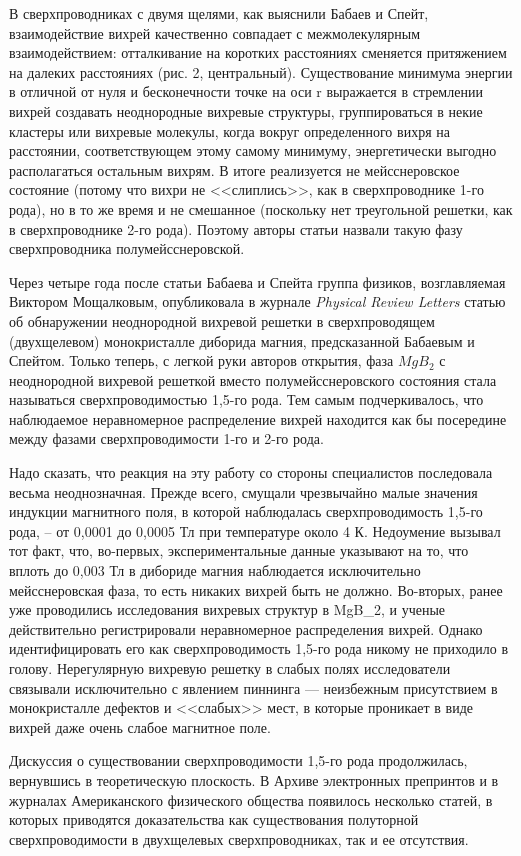 В сверхпроводниках с двумя щелями, как выяснили Бабаев и Спейт, взаимодействие 
вихрей качественно совпадает с межмолекулярным взаимодействием: отталкивание 
на коротких расстояниях сменяется притяжением на далеких расстояниях 
(рис. 2, центральный). Существование минимума энергии в отличной от нуля и 
бесконечности точке на оси r выражается в стремлении вихрей создавать 
неоднородные вихревые структуры, группироваться в некие кластеры или вихревые 
молекулы, когда вокруг определенного вихря на расстоянии, соответствующем 
этому самому минимуму, энергетически выгодно располагаться остальным вихрям. 
В итоге реализуется не мейсснеровское состояние (потому что вихри не 
<<слиплись>>, как в сверхпроводнике 1-го рода), но в то же время и не 
смешанное (поскольку нет треугольной решетки, как в сверхпроводнике 2-го 
рода). Поэтому авторы статьи назвали такую фазу сверхпроводника 
полумейсснеровской.

Через четыре года после статьи Бабаева и Спейта группа физиков, возглавляемая 
Виктором Мощалковым, опубликовала в журнале \emph{Physical Review Letters} 
статью об обнаружении неоднородной вихревой решетки в сверхпроводящем 
(двухщелевом) монокристалле диборида магния, предсказанной Бабаевым и Спейтом. 
Только теперь, с легкой руки авторов открытия, фаза \( MgB_2 \) с неоднородной
 вихревой решеткой вместо полумейсснеровского состояния стала называться 
 сверхпроводимостью 1,5-го рода. Тем самым подчеркивалось, что наблюдаемое 
 неравномерное распределение вихрей находится как бы посередине между фазами 
 сверхпроводимости 1-го и 2-го рода.

Надо сказать, что реакция на эту работу со стороны специалистов последовала 
весьма неоднозначная. Прежде всего, смущали чрезвычайно малые значения 
индукции магнитного поля, в которой наблюдалась сверхпроводимость 1,5-го 
рода, -- от 0,0001 до 0,0005 Тл при температуре около 4 К. Недоумение вызывал 
тот факт, что, во-первых, экспериментальные данные указывают на то, что 
вплоть до 0,003 Тл в дибориде магния наблюдается исключительно мейсснеровская 
фаза, то есть никаких вихрей быть не должно. Во-вторых, ранее уже проводились 
исследования вихревых структур в MgB_2, и ученые действительно регистрировали 
неравномерное распределения вихрей. Однако идентифицировать его как 
сверхпроводимость 1,5-го рода никому не приходило в голову. Нерегулярную 
вихревую решетку в слабых полях исследователи связывали исключительно с 
явлением пиннинга — неизбежным присутствием в монокристалле дефектов и 
<<слабых>> мест, в которые проникает в виде вихрей даже очень слабое 
магнитное поле.

Дискуссия о существовании сверхпроводимости 1,5-го рода продолжилась, 
вернувшись в теоретическую плоскость. В Архиве электронных препринтов и в 
журналах Американского физического общества появилось несколько статей, в 
которых приводятся доказательства как существования полуторной 
сверхпроводимости в двухщелевых сверхпроводниках, так и ее отсутствия. 